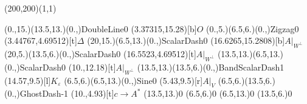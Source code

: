 \unitlength=1bp%

\begin{feynartspicture}(200,200)(1,1)

\FADiagram{}
\FAProp(0.,15.)(13.5,13.)(0.,){DoubleLine}{0}
\FALabel(3.37315,15.28)[b]{$O$}
\FAProp(0.,5.)(6.5,6.)(0.,){Zigzag}{0}
\FALabel(3.44767,4.69512)[t]{$\Delta$}
\FAProp(20,15.)(6.5,13.)(0.,){ScalarDash}{0}
\FALabel(16.6265,15.2808)[b]{$A|_{W^\perp}$}
\FAProp(20,5.)(13.5,6.)(0.,){ScalarDash}{0}
\FALabel(16.5523,4.69512)[t]{$A|_{W^\perp}$}
\FAProp(13.5,13.)(6.5,13.)(0.,){ScalarDash}{0}
\FALabel(10.,12.18)[t]{$A|_{W^\perp}$}
\FAProp(13.5,13.)(13.5,6.)(0.,){BandScalarDash}{1}
\FALabel(14.57,9.5)[l]{$K_\varepsilon$}
\FAProp(6.5,6.)(6.5,13.)(0.,){Sine}{0}
\FALabel(5.43,9.5)[r]{$A|_V$}
\FAProp(6.5,6.)(13.5,6.)(0.,){GhostDash}{-1}
\FALabel(10.,4.93)[t]{$c\to A^*$}
\FAVert(13.5,13.){0}
\FAVert(6.5,6.){0}
\FAVert(6.5,13.){0}
\FAVert(13.5,6.){0}
\end{feynartspicture}

